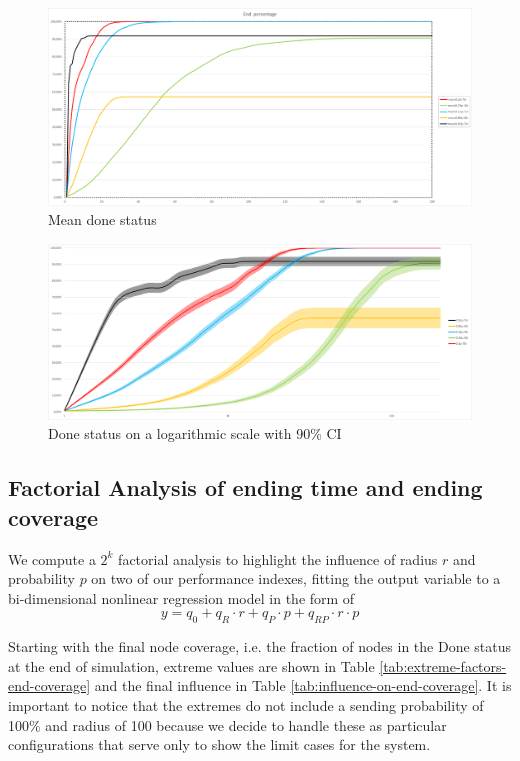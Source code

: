 \begin{figure}[H]
\centering
    \includegraphics[width= 1\textwidth]{./images/temporalDone.png}
    \caption{Mean done status}
    \label{fig:done-status}
\end{figure}
\begin{figure}[H]
\centering
    \includegraphics[width= 1\textwidth]{./images/temporalDoneLog.png}
    \caption{Done status on a logarithmic scale with 90\% CI}
    \label{fig:done-status-log}
\end{figure}

\subsection{Factorial Analysis of ending time and ending coverage}

We compute a $2^k$ factorial analysis to highlight the influence of radius $r$ and probability $p$ on two of our performance indexes, fitting the output variable to a bi-dimensional nonlinear regression model in the form of 
$$
y = q_0 + q_R \cdot r + q_P \cdot p + q_{RP} \cdot r \cdot p
$$

Starting with the final node coverage, i.e. the fraction of nodes in the Done status at the end of simulation, extreme values are shown in Table \ref{tab:extreme-factors-end-coverage} and the final influence in Table \ref{tab:influence-on-end-coverage}. It is important to notice that the extremes do not include a sending probability of 100\% and radius of 100 because we decide to handle these as particular configurations that serve only to show the limit cases for the system.



